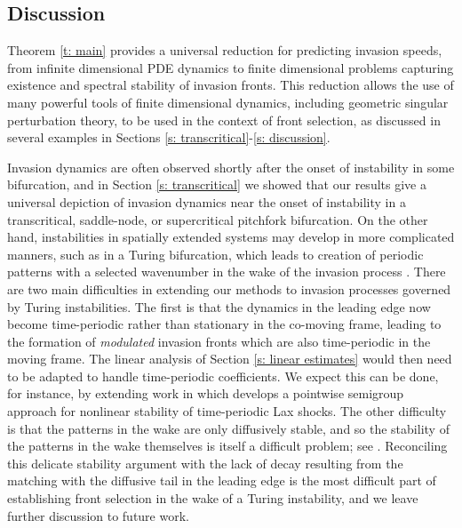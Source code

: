 \documentclass[11pt]{article}
\numberwithin{equation}{section}
\numberwithin{prop}{section}
\begin{document}
\subsection{Discussion}
Theorem \ref{t: main} provides a universal reduction for predicting invasion speeds, from infinite dimensional PDE dynamics to finite dimensional problems capturing existence and spectral stability of invasion fronts. This reduction allows the use of many powerful tools of finite dimensional dynamics, including geometric singular perturbation theory, to be used in the context of front selection, as discussed in several examples in Sections \ref{s: transcritical}-\ref{s: discussion}. 

Invasion dynamics are often observed shortly after the onset of instability in some bifurcation, and in Section \ref{s: transcritical} we showed that our results give a universal depiction of invasion dynamics near the onset of instability in a transcritical, saddle-node, or supercritical pitchfork bifurcation. On the other hand, instabilities in spatially extended systems may develop in more complicated manners, such as in a Turing bifurcation, which leads to creation of periodic patterns with a selected wavenumber in the wake of the invasion process \cite{vanSaarloosReview}. There are two main difficulties in extending our methods to invasion processes governed by Turing instabilities. The first is that the dynamics in the leading edge now become time-periodic rather than stationary in the co-moving frame, leading to the formation of \emph{modulated} invasion fronts \cite{EbertvanSaarloos, EckmannWayne} which are also time-periodic in the moving frame. The linear analysis of Section \ref{s: linear estimates} would then need to be adapted to handle time-periodic coefficients. We expect this can be done, for instance, by extending work in \cite{MargaretBjornKevinTimePeriodic} which develops a pointwise semigroup approach for nonlinear stability of time-periodic Lax shocks. The other difficulty is that the patterns in the wake are only diffusively stable, and so the stability of the patterns in the wake themselves is itself a difficult problem; see \cite{jnrz1, jnrz2, zumbruninventiones, uecker}. Reconciling this delicate stability argument with the lack of decay resulting from the matching with the diffusive tail in the leading edge is the most difficult part of establishing front selection in the wake of a Turing instability, and we leave further discussion to future work. 


\appendix
\end{document}

